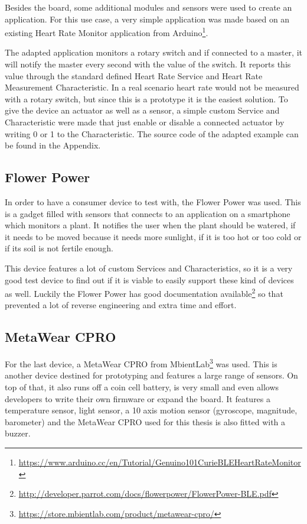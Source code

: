 \documentclass[pdftex,a4paper,12pt,twoside]{report}
\begin{document}
Besides the board, some additional modules and sensors were used to create an application. For this use case, a very simple application was made based on an existing Heart Rate Monitor application from Arduino\footnote{\url{https://www.arduino.cc/en/Tutorial/Genuino101CurieBLEHeartRateMonitor}}.

The adapted application monitors a rotary switch and if connected to a master, it will notify the master every second with the value of the switch. It reports this value through the standard defined Heart Rate Service and Heart Rate Measurement Characteristic. In a real scenario heart rate would not be measured with a rotary switch, but since this is a prototype it is the easiest solution. To give the device an actuator as well as a sensor, a simple custom Service and Characteristic were made that just enable or disable a connected actuator by writing 0 or 1 to the Characteristic. The source code of the adapted example can be found in the Appendix.

\subsection{Flower Power}
\label{subsec:flowerpower}
In order to have a consumer device to test with, the Flower Power was used. This is a gadget filled with sensors that connects to an application on a smartphone which monitors a plant. It notifies the user when the plant should be watered, if it needs to be moved because it needs more sunlight, if it is too hot or too cold or if its soil is not fertile enough.

This device features a lot of custom Services and Characteristics, so it is a very good test device to find out if it is viable to easily support these kind of devices as well. Luckily the Flower Power has good documentation available\footnote{\url{http://developer.parrot.com/docs/flowerpower/FlowerPower-BLE.pdf}} so that prevented a lot of reverse engineering and extra time and effort.

\subsection{MetaWear CPRO}
\label{subsec:metawearcpro}
For the last device, a MetaWear CPRO from MbientLab\footnote{\url{https://store.mbientlab.com/product/metawear-cpro/}} was used. This is another device destined for prototyping and features a large range of sensors. On top of that, it also runs off a coin cell battery, is very small and even allows developers to write their own firmware or expand the board. It features a temperature sensor, light sensor, a 10 axis motion sensor (gyroscope, magnitude, barometer) and the MetaWear CPRO used for this thesis is also fitted with a buzzer.
\end{document}
